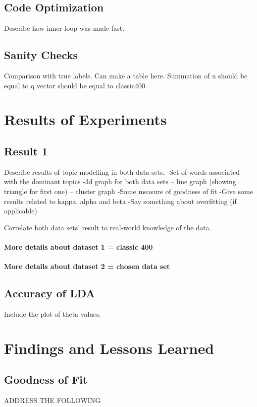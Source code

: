 \documentclass[11pt,a4paper,oneside]{article}
\begin{document}
\subsection{Code Optimization}
Describe how inner loop was made fast.

\subsection{Sanity Checks}
Comparison with true labels. 
Can make a table here.
Summation of n should be equal to q vector should be equal to classic400.

\section{Results of Experiments}
\label{sec:Results}

\subsection{Result 1}
Describe results of topic modelling in both data sets.
-Set of words associated with the dominant topics
-3d graph for both data sets 
	-- line graph (showing triangle for first one)
	-- cluster graph
-Some measure of goodness of fit
-Give some results related to kappa, alpha and beta
-Say something about overfitting (if applicable)

Correlate both data sets' result to real-world knowledge of the data.

\paragraph{More details about dataset 1 = classic 400}
\paragraph{More details about dataset 2 = chosen data set}

\subsection{Accuracy of LDA}
Include the plot of theta values.

\section{Findings and Lessons Learned}

\subsection{Goodness of Fit}
ADDRESS THE FOLLOWING
\end{document}
